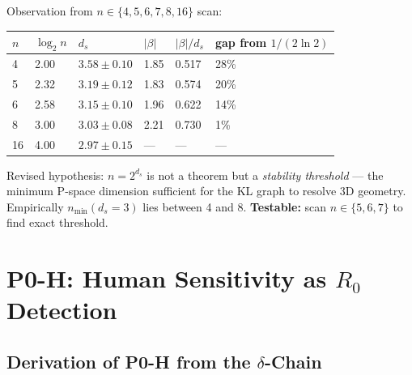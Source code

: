 \documentclass[12pt, a4paper]{article}
\begin{document}
\begin{derivedbox}[title={$n_{\min}$ Hypothesis: Stability Threshold, Not Saturation}]
Observation from $n \in \{4, 5, 6, 7, 8, 16\}$ scan:

\begin{center}
\renewcommand{\arraystretch}{1.35}
\begin{tabular}{p{0.7cm} p{1.4cm} p{2.7cm} p{1.3cm} p{1.8cm} p{2.5cm}}
\toprule
$n$ & $\log_2 n$ & $d_s$ & $|\beta|$ & $|\beta|/d_s$ & gap from $1/(2\ln 2)$ \\
\midrule
4 & 2.00 & $3.58 \pm 0.10$ & 1.85 & 0.517 & 28\% \\
5 & 2.32 & $3.19 \pm 0.12$ & 1.83 & 0.574 & 20\% \\
6 & 2.58 & $3.15 \pm 0.10$ & 1.96 & 0.622 & 14\% \\
8 & 3.00 & $3.03 \pm 0.08$ & 2.21 & 0.730 & 1\% \\
16 & 4.00 & $2.97 \pm 0.15$ & --- & --- & --- \\
\bottomrule
\end{tabular}
\end{center}

Revised hypothesis: $n = 2^{d_s}$ is not a theorem but a \emph{stability threshold} ---
the minimum P-space dimension sufficient for the KL graph to resolve 3D geometry.
Empirically $n_{\min}(d_s = 3)$ lies between 4 and 8.
\textbf{Testable:} scan $n \in \{5, 6, 7\}$ to find exact threshold.
\end{derivedbox}

\section{P0-H: Human Sensitivity as $R_0$ Detection}

\subsection{Derivation of P0-H from the $\delta$-Chain}
\end{document}
